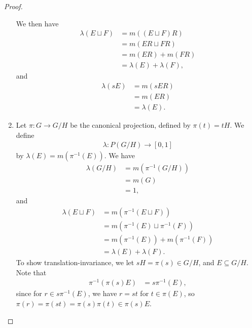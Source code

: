 \documentclass[10pt]{mypackage2}
\begin{document}
\begin{proof}
\begin{enumerate}[(1)]
      We then have
      \begin{align*}
        \lambda\left(E\sqcup F\right) &= m\left(\left(E\sqcup F\right)R\right)\\
                                      &= m\left(ER\sqcup FR\right)\\
                                      &= m\left(ER\right) + m\left(FR\right)\\
                                      &= \lambda\left(E\right) + \lambda\left(F\right),
      \end{align*}
      and
      \begin{align*}
        \lambda\left(sE\right) &= m\left(sER\right)\\
                               &= m\left(ER\right)\\
                               &= \lambda\left(E\right).
      \end{align*}
    \item Let $\pi\colon G\rightarrow G/H$ be the canonical projection, defined by $\pi\left(t\right) = tH$. We define
      \begin{align*}
        \lambda\colon P\left(G/H\right) \rightarrow [0,1]
      \end{align*}
      by $\lambda(E) = m\left(\pi^{-1}\left(E\right)\right)$. We have
      \begin{align*}
        \lambda\left(G/H\right) &= m\left(\pi^{-1}\left(G/H\right)\right)\\
                                &= m\left(G\right)\\
                                &= 1,
      \end{align*}
      and
      \begin{align*}
        \lambda\left(E\sqcup F\right) &= m\left(\pi^{-1}\left(E\sqcup F\right)\right)\\
                                      &= m\left(\pi^{-1}\left(E\right)\sqcup \pi^{-1}\left(F\right)\right)\\
                                      &= m\left(\pi^{-1}\left(E\right)\right) + m\left(\pi^{-1}\left(F\right)\right)\\
                                      &= \lambda(E) + \lambda(F).
      \end{align*}
      To show translation-invariance, we let $sH = \pi(s)\in G/H$, and $E\subseteq G/H$. Note that
      \begin{align*}
        \pi^{-1}\left(\pi(s)E\right) &= s\pi^{-1}\left(E\right),
      \end{align*}
      since for $r\in s\pi^{-1}(E)$, we have $r = st$ for $t\in \pi(E)$, so $\pi\left(r\right) =\pi\left(st\right) = \pi\left(s\right)\pi\left(t\right)\in \pi\left(s\right)E$.\newline


\end{enumerate}
\end{proof}
\end{document}

